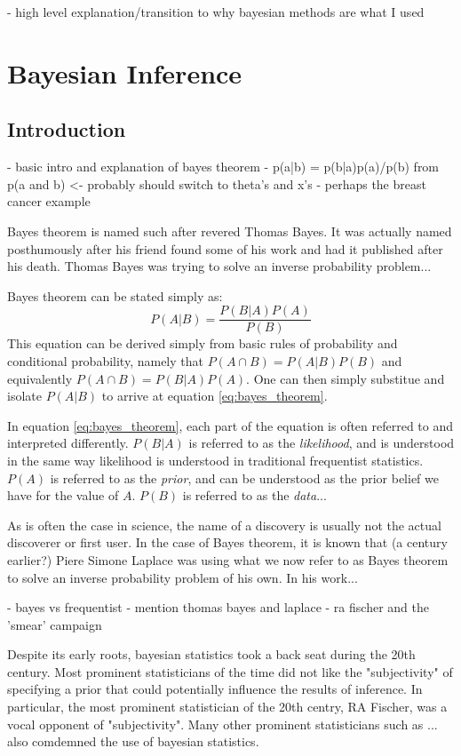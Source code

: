 - high level explanation/transition to why bayesian methods are what I used

\section{Bayesian Inference}

\subsection{Introduction}

- basic intro and explanation of bayes theorem
- p(a|b) = p(b|a)p(a)/p(b) from p(a and b) <- probably should switch to theta's and x's
- perhaps the breast cancer example

Bayes theorem is named such after revered Thomas Bayes. It was actually named posthumously after his friend found some of his work and had it published after his death. Thomas Bayes was trying to solve an inverse probability problem...

Bayes theorem can be stated simply as:
\begin{equation} \label{eq:bayes_theorem}
P(A|B) = \frac{P(B|A)P(A)}{P(B)}
\end{equation}
This equation can be derived simply from basic rules of probability and conditional probability, namely that $P(A\cap B) = P(A|B)P(B)$ and equivalently $P(A \cap B) = P(B|A)P(A)$. One can then simply substitue and isolate $P(A|B)$ to arrive at equation \ref{eq:bayes_theorem}.

In equation \ref{eq:bayes_theorem}, each part of the equation is often referred to and interpreted differently. $P(B|A)$ is referred to as the \textit{likelihood}, and is understood in the same way likelihood is understood in traditional frequentist statistics. $P(A)$ is referred to as the \textit{prior}, and can be understood as the prior belief we have for the value of $A$. $P(B)$ is referred to as the \textit{data}...

As is often the case in science, the name of a discovery is usually not the actual discoverer or first user. In the case of Bayes theorem, it is known that (a century earlier?) Piere Simone Laplace was using what we now refer to as Bayes theorem to solve an inverse probability problem of his own. In his work...


- bayes vs frequentist
- mention thomas bayes and laplace
- ra fischer and the 'smear' campaign

Despite its early roots, bayesian statistics took a back seat during the 20th century. Most prominent statisticians of the time did not like the "subjectivity" of specifying a prior that could potentially influence the results of inference. In particular, the most prominent statistician of the 20th centry, RA Fischer, was a vocal opponent of "subjectivity". Many other prominent statisticians such as ... also comdemned the use of bayesian statistics.

